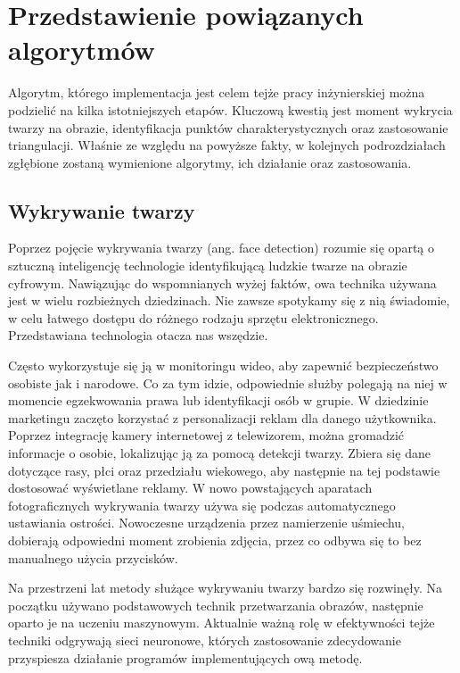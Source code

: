 \chapter{Przedstawienie powiązanych algorytmów}
\label{cha:analizaTeoretycznaProblemu}
Algorytm, którego implementacja jest celem tejże pracy inżynierskiej można podzielić na kilka istotniejszych etapów. Kluczową kwestią jest moment wykrycia twarzy na obrazie, identyfikacja punktów charakterystycznych oraz zastosowanie triangulacji. Właśnie ze względu na  powyższe fakty, w kolejnych podrozdziałach zgłębione zostaną wymienione algorytmy, ich działanie oraz zastosowania. 


\section{Wykrywanie twarzy}
Poprzez pojęcie wykrywania twarzy (ang. face detection) \cite{fDetection} rozumie się opartą o sztuczną inteligencję technologie identyfikującą ludzkie twarze na obrazie cyfrowym. Nawiązując do wspomnianych wyżej faktów, owa technika używana jest w wielu rozbieżnych dziedzinach. Nie zawsze spotykamy się z nią świadomie, w celu łatwego dostępu do różnego rodzaju sprzętu elektronicznego. Przedstawiana technologia otacza nas wszędzie.

Często wykorzystuje się ją w monitoringu wideo, aby zapewnić bezpieczeństwo osobiste jak i narodowe. Co za tym idzie, odpowiednie służby polegają na niej w momencie egzekwowania prawa lub identyfikacji osób w grupie. W dziedzinie marketingu zaczęto korzystać z personalizacji reklam dla danego użytkownika. Poprzez integrację kamery internetowej z telewizorem, można gromadzić informacje o osobie, lokalizując ją za pomocą detekcji twarzy. Zbiera się dane dotyczące rasy, płci oraz przedziału wiekowego, aby następnie na tej podstawie dostosować wyświetlane reklamy. W nowo powstających aparatach fotograficznych wykrywania twarzy używa się podczas automatycznego ustawiania ostrości. Nowoczesne urządzenia przez namierzenie uśmiechu, dobierają odpowiedni moment zrobienia zdjęcia, przez co odbywa się to bez manualnego użycia przycisków. \cite{fDetection2}

Na przestrzeni lat metody służące wykrywaniu twarzy bardzo się rozwinęły. Na początku używano podstawowych technik przetwarzania obrazów, następnie oparto je na uczeniu maszynowym. Aktualnie ważną rolę w efektywności tejże techniki odgrywają sieci neuronowe, których zastosowanie zdecydowanie przyspiesza działanie programów implementujących ową metodę.

